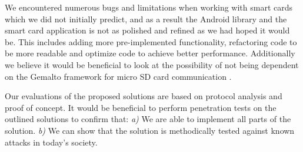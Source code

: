 We encountered numerous bugs and limitations when working with smart cards which we did not initially predict, and as a result the Android library and the smart card application is not as polished and refined as we had hoped it would be. This includes adding more pre-implemented functionality, refactoring code to be more readable and optimize code to achieve better performance. Additionally we believe it would be beneficial to look at the possibility of not being dependent on the Gemalto framework for micro SD card communication \cite[\textit{SEEK for Android}]{SEEK}.

Our evaluations of the proposed solutions are based on protocol analysis and proof of concept. It would be beneficial to perform penetration tests on the outlined solutions to confirm that: \textit{a)} We are able to implement all parts of the solution. \textit{b)} We can show that the solution is methodically tested against known attacks in today's society.
